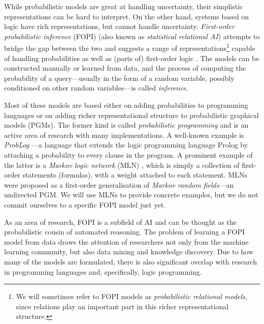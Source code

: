 \documentclass{article}
\begin{document}
While probabilistic models are great at handling uncertainty, their
simplistic representations can be hard to interpret. On the other hand, systems
based on logic have rich representations, but cannot handle uncertainty.
\emph{First-order probabilistic inference} (FOPI) (also known as
\emph{statistical relational AI}) attempts to bridge the gap
between the two and suggests a range of representations\footnote{ We will
  sometimes refer to FOPI models as \emph{probabilistic relational models},
  since relations play an important part in this richer representational
  structure.} capable of handling probabilities as well as (parts of)
first-order logic \cite{DBLP:series/sci/BrazAR08}. The models can be constructed
manually or learned from data, and the process of computing the probability of a
query---usually in the form of a random variable, possibly conditioned on other
random variables---is called \emph{inference}.

Most of these models are based either on adding probabilities to programming
languages or on adding richer representational structure to probabilistic
graphical models (PGMs). The former kind is called \emph{probabilistic
  programming} \cite{DBLP:conf/icse/GordonHNR14} and is an active area of
research with many implementations. A well-known example is \emph{ProbLog}
\cite{DBLP:conf/ijcai/RaedtKT07}---a language that extends the logic programming
language Prolog by attaching a probability to every clause in the program. A
prominent example of the latter is a \emph{Markov logic network} (MLN)
\cite{DBLP:journals/ml/RichardsonD06}, which is simply a collection of
first-order statements (formulas), with a weight attached to each statement.
MLNs were proposed as a first-order generalisation of \emph{Markov random
  fields}---an undirected PGM. We will use MLNs to provide concrete examples,
but we do not commit ourselves to a specific FOPI model just yet.

As an area of research, FOPI is a subfield of AI and can be thought as the
probabilistic cousin of automated reasoning. The problem of learning a FOPI
model from data draws the attention of researchers not only from the machine
learning community, but also data mining and knowledge discovery. Due to how
many of the models are formulated, there is also significant overlap with
research in programming languages and, specifically, logic programming.
\end{document}
